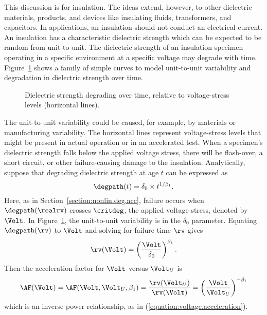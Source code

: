 This discussion is for insulation. The ideas extend,
however, to other dielectric materials, products, and devices like
insulating fluids, transformers, and capacitors. In applications, an
insulation should not conduct an electrical current. An insulation has
a characteristic dielectric strength which can be expected to be
random from unit-to-unit. The dielectric strength of an insulation 
specimen operating in a specific
environment at a specific voltage may degrade with time.
Figure~\ref{figure:dielectric.breakdown.example.ps} shows a family of
simple curves to model unit-to-unit variability and 
degradation in dielectric strength over time.
\begin{figure}
\caption{Dielectric strength degrading over time, relative to
voltage-stress
levels (horizontal lines).}
\label{figure:dielectric.breakdown.example.ps}
\end{figure}
The unit-to-unit variability could be caused, for example, by
materials or manufacturing variability. The horizontal lines
represent voltage-stress levels that might be present in actual
operation or in an accelerated test.  When a specimen's dielectric
strength falls below the applied voltage stress, there will be
flash-over, a short circuit, or other failure-causing damage to the
insulation.  Analytically, suppose that degrading dielectric strength
at age $t$ can be expressed as
\begin{displaymath}
\degpath(t) = \delta_{0} \times t^{1/\beta_{1}}.
\end{displaymath}
Here, as in Section~\ref{section:nonlin.deg.acc}, failure occurs
when $\degpath(\realrv)$ crosses $\critdeg$, the applied voltage
stress, denoted by $\Volt$.  In
Figure~\ref{figure:dielectric.breakdown.example.ps}, the
unit-to-unit variability is in the $\delta_{0}$ parameter. Equating
$\degpath(\rv)$ to $\Volt$ and solving for failure time $\rv$ gives
\begin{displaymath}
{\rv}(\Volt) =\left ( \frac{\Volt}{\delta_{0}} \right)^{\beta_{1}}.
\end{displaymath}
Then the acceleration factor for $\Volt$ versus $\Volt_{U}$ is
\begin{displaymath}
\AF(\Volt)=\AF(\Volt,\Volt_{U}, \beta_{1})= 
	\frac{{\rv}(\Volt_{U})}{{\rv}(\Volt)}=
	\left (  \frac{  \Volt }{ \Volt_{U}}  \right) ^{-\beta_{1}}
\end{displaymath}
which is an inverse power relationship, as in
(\ref{equation:voltage.acceleration}).

